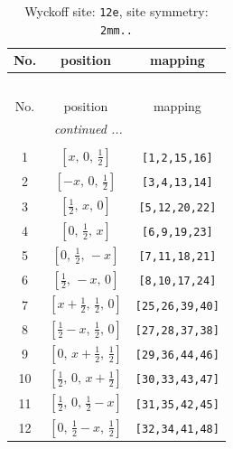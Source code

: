 \documentclass[fleqn,8pt]{jsarticle}
\begin{document}
\begin{longtable}{ccc}
\caption{Wyckoff site: {\tt 12e}, site symmetry: {\tt 2mm..}}
 \\
 \hline \hline
No. & position & mapping \\ \hline \endfirsthead

\multicolumn{2}{l}{\tablename\ \thetable{}} \\
 \hline \hline
No. & position & mapping \\ \hline \endhead

 \hline \hline
\multicolumn{2}{r}{\footnotesize\it continued ...} \\ \endfoot

 \hline \hline
\multicolumn{2}{r}{} \\ \endlastfoot

1 & $\left[ x,\, 0,\, \frac{1}{2} \right]$ & {\tt [1,2,15,16]} \\ \hline
2 & $\left[ - x,\, 0,\, \frac{1}{2} \right]$ & {\tt [3,4,13,14]} \\ \hline
3 & $\left[ \frac{1}{2},\, x,\, 0 \right]$ & {\tt [5,12,20,22]} \\ \hline
4 & $\left[ 0,\, \frac{1}{2},\, x \right]$ & {\tt [6,9,19,23]} \\ \hline
5 & $\left[ 0,\, \frac{1}{2},\, - x \right]$ & {\tt [7,11,18,21]} \\ \hline
6 & $\left[ \frac{1}{2},\, - x,\, 0 \right]$ & {\tt [8,10,17,24]} \\ \hline
7 & $\left[ x + \frac{1}{2},\, \frac{1}{2},\, 0 \right]$ & {\tt [25,26,39,40]} \\ \hline
8 & $\left[ \frac{1}{2} - x,\, \frac{1}{2},\, 0 \right]$ & {\tt [27,28,37,38]} \\ \hline
9 & $\left[ 0,\, x + \frac{1}{2},\, \frac{1}{2} \right]$ & {\tt [29,36,44,46]} \\ \hline
10 & $\left[ \frac{1}{2},\, 0,\, x + \frac{1}{2} \right]$ & {\tt [30,33,43,47]} \\ \hline
11 & $\left[ \frac{1}{2},\, 0,\, \frac{1}{2} - x \right]$ & {\tt [31,35,42,45]} \\ \hline
12 & $\left[ 0,\, \frac{1}{2} - x,\, \frac{1}{2} \right]$ & {\tt [32,34,41,48]} \\
\end{longtable}
\renewcommand{\arraystretch}{1.2}
\end{document}
